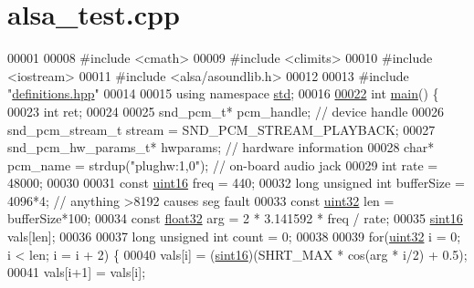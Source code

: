 \hypertarget{alsa__test_8cpp_source}{\section{alsa\+\_\+test.\+cpp}
\label{alsa__test_8cpp_source}
}

\begin{DoxyCode}
00001 
00008 \textcolor{preprocessor}{#include <cmath>}
00009 \textcolor{preprocessor}{#include <climits>}
00010 \textcolor{preprocessor}{#include <iostream>}
00011 \textcolor{preprocessor}{#include <alsa/asoundlib.h>}
00012 
00013 \textcolor{preprocessor}{#include "\hyperlink{definitions_8hpp}{definitions.hpp}"}
00014 
00015 \textcolor{keyword}{using namespace }\hyperlink{namespacestd}{std};
00016 
\hypertarget{alsa__test_8cpp_source_l00022}{}\hyperlink{alsa__test_8cpp_ae66f6b31b5ad750f1fe042a706a4e3d4}{00022} \textcolor{keywordtype}{int} \hyperlink{alsa__test_8cpp_ae66f6b31b5ad750f1fe042a706a4e3d4}{main}() \{
00023     \textcolor{keywordtype}{int} ret;
00024 
00025     snd\_pcm\_t* pcm\_handle;  \textcolor{comment}{// device handle}
00026     snd\_pcm\_stream\_t stream = SND\_PCM\_STREAM\_PLAYBACK;
00027     snd\_pcm\_hw\_params\_t* hwparams;  \textcolor{comment}{// hardware information}
00028     \textcolor{keywordtype}{char}* pcm\_name = strdup(\textcolor{stringliteral}{"plughw:1,0"});  \textcolor{comment}{// on-board audio jack}
00029     \textcolor{keywordtype}{int} rate = 48000;
00030 
00031     \textcolor{keyword}{const} \hyperlink{definitions_8hpp_a05f6b0ae8f6a6e135b0e290c25fe0e4e}{uint16} freq = 440;
00032     \textcolor{keywordtype}{long} \textcolor{keywordtype}{unsigned} \textcolor{keywordtype}{int} bufferSize = 4096*4;  \textcolor{comment}{// anything >8192 causes seg fault}
00033     \textcolor{keyword}{const} \hyperlink{definitions_8hpp_a1134b580f8da4de94ca6b1de4d37975e}{uint32} len = bufferSize*100;
00034     \textcolor{keyword}{const} \hyperlink{definitions_8hpp_aacdc525d6f7bddb3ae95d5c311bd06a1}{float32} arg = 2 * 3.141592 * freq / rate;
00035     \hyperlink{definitions_8hpp_a74df79fde3c518e55b29ce6360a9c76e}{sint16} vals[len];
00036 
00037     \textcolor{keywordtype}{long} \textcolor{keywordtype}{unsigned} \textcolor{keywordtype}{int} count = 0;
00038 
00039     \textcolor{keywordflow}{for}(\hyperlink{definitions_8hpp_a1134b580f8da4de94ca6b1de4d37975e}{uint32} i = 0; i < len; i = i + 2) \{
00040         vals[i] = (\hyperlink{definitions_8hpp_a74df79fde3c518e55b29ce6360a9c76e}{sint16})(SHRT\_MAX * cos(arg * i/2) + 0.5);
00041         vals[i+1] = vals[i];

\end{DoxyCode}
